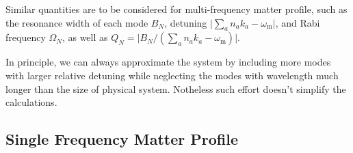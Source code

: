 \documentclass[%
reprint,
 amsmath,amssymb,
 aps,
]{revtex4-1}
\begin{document}
Similar quantities are to be considered for multi-frequency matter profile, such as the resonance width of each mode $B_N$, detuning $\lvert \sum_a n_a k_a - \omega_{\mathrm{m}} \rvert$, and Rabi frequency $\Omega_N$, as well as $Q_N =\lvert B_N/( \sum_a n_a k_a - \omega_{\mathrm{m}}  )\rvert$. 

In principle, we can always approximate the system by including more modes with larger relative detuning while neglecting the modes with wavelength much longer than the size of physical system. Notheless such effort doesn't simplify the calculations.




\subsection{Single Frequency Matter Profile}
\end{document}
